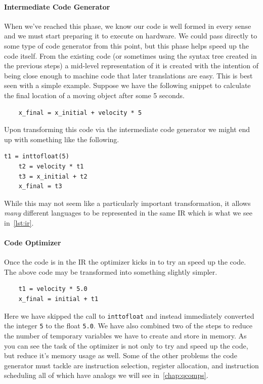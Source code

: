 \paragraph{Intermediate Code Generator}
When we've reached this phase, we know our code is well formed in every sense and we must start preparing it to execute on hardware.
We could pass directly to some type of code generator from this point, but this phase helps speed up the code itself.
From the existing code (or sometimes using the syntax tree created in the previous steps) a mid-level representation of it is created with the intention of being close enough to machine code that later translations are easy.
This is best seen with a simple example.
Suppose we have the following snippet to calculate the final location of a moving object after some 5 seconds.
\begin{lstlisting}
    x_final = x_initial + velocity * 5
\end{lstlisting}
Upon transforming this code via the intermediate code generator we might end up with something like the following.
\begin{lstlisting}[label=lst:ir]
    t1 = inttofloat(5)
    t2 = velocity * t1
    t3 = x_initial + t2
    x_final = t3
\end{lstlisting}
While this may not seem like a particularly important transformation, it allows \emph{many} different languages to be represented in the same \acf{IR} which is what we see in~\cref{lst:ir}.%

\paragraph{Code Optimizer}
Once the code is in the \ac{IR} the optimizer kicks in to try an speed up the code.
The above code may be transformed into something slightly simpler.
\begin{lstlisting}
    t1 = velocity * 5.0
    x_final = initial + t1
\end{lstlisting}
Here we have skipped the call to \texttt{inttofloat} and instead immediately converted the integer \texttt{5} to the float \texttt{5.0}.
We have also combined two of the steps to reduce the number of temporary variables we have to create and store in memory.
As you can see the task of the optimizer is not only to try and speed up the code, but reduce it's memory usage as well.
Some of the other problems the code generator must tackle are instruction selection, register allocation, and instruction scheduling all of which have analogs we will see in~\cref{chap:qcomps}.

